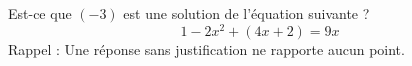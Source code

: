 \medskip

Est-ce que $(-3)$ est une solution de l’équation suivante ?
\[1-2x^2+(4x+2)=9x\]
Rappel : Une réponse sans justification ne rapporte aucun point. 